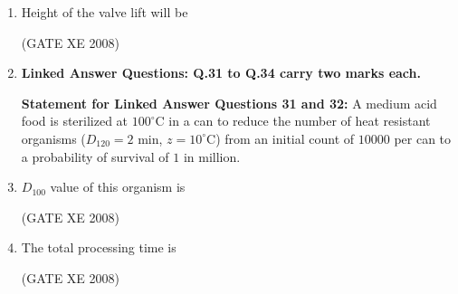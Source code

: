 \documentclass[12pt]{article}
\begin{document}
\begin{enumerate}
(GATE XE 2008)  

\item Height of the valve lift will be  

\begin{enumerate}
\end{enumerate}

(GATE XE 2008)  

\item[] \textbf{\Large Linked Answer Questions: Q.31 to Q.34 carry two marks each.}

  
\textbf{ Statement for Linked Answer Questions 31 and 32:  }
A medium acid food is sterilized at $100^\circ$C in a can to reduce the number of heat resistant organisms ($D_{120} = 2$ min, $z = 10^\circ$C) from an initial count of $10000$ per can to a probability of survival of $1$ in million.  

\item $D_{100}$ value of this organism is 

\begin{enumerate}
\end{enumerate}

(GATE XE 2008)  

\item The total processing time is  

\begin{enumerate}
\end{enumerate}

(GATE XE 2008)  


\end{enumerate}
\end{document}
